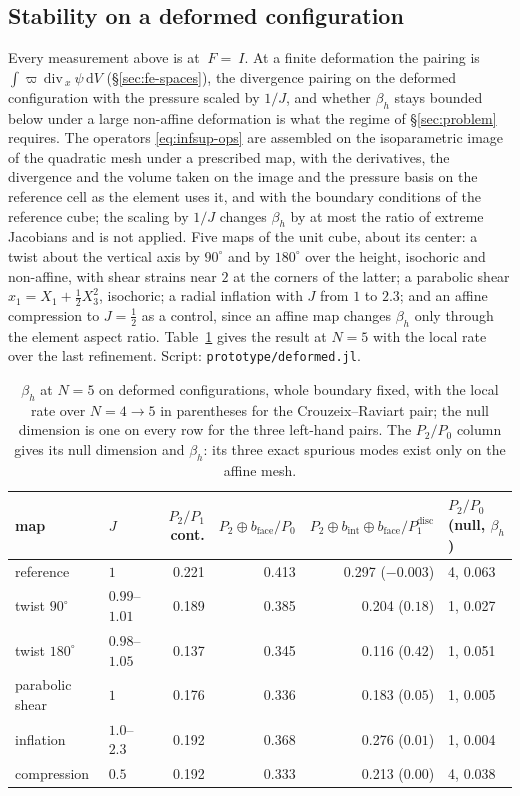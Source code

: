 \documentclass[11pt]{article}
\newcommand{\F}{~F}
\newcommand{\Id}{~I}
\newcommand{\testd}{~\psi}
\newcommand{\bx}{~x}
\newcommand{\diff}{\,\mathrm{d}}
\newcommand{\code}[1]{\texttt{#1}}
\theoremstyle{definition}
\theoremstyle{plain}
\begin{document}
\subsection{Stability on a deformed configuration}
\label{sec:deformed}

Every measurement above is at $\F = \Id$. At a finite deformation the
pairing is $\int \varpi\,\mathrm{div}_{\bx}\testd \diff V$ (\S\ref{sec:fe-spaces}),
the divergence pairing on the deformed configuration with the pressure scaled
by $1/J$, and whether $\beta_h$ stays bounded below under a large non-affine
deformation is what the regime of \S\ref{sec:problem} requires. The operators
\eqref{eq:infsup-ops} are assembled on the isoparametric image of the
quadratic mesh under a prescribed map, with the derivatives, the divergence
and the volume taken on the image and the pressure basis on the reference
cell as the element uses it, and with the boundary conditions of the
reference cube; the scaling by $1/J$ changes $\beta_h$ by at most the ratio
of extreme Jacobians and is not applied. Five maps of the unit cube, about
its center: a twist about the vertical axis by $90^\circ$ and by $180^\circ$
over the height, isochoric and non-affine, with shear strains near $2$ at the
corners of the latter; a parabolic shear $x_1 = X_1 + \tfrac12 X_3^2$,
isochoric; a radial inflation with $J$ from $1$ to $2.3$; and an affine
compression to $J = \tfrac12$ as a control, since an affine map changes
$\beta_h$ only through the element aspect ratio. Table~\ref{tab:deformed}
gives the result at $N = 5$ with the local rate over the last refinement.
Script: \code{prototype/deformed.jl}.

\begin{table}[tbp]
\centering
\caption{$\beta_h$ at $N = 5$ on deformed configurations, whole boundary
fixed, with the local rate over $N = 4 \to 5$ in parentheses for the
Crouzeix--Raviart pair; the null dimension is one on every row for the three
left-hand pairs. The $P_2/P_0$ column gives its null dimension and
$\beta_h$: its three exact spurious modes exist only on the affine mesh.}
\label{tab:deformed}
\begin{tabular}{@{}llrrrl@{}}
\toprule
map & $J$ & $P_2/P_1$ cont. & $P_2 \oplus b_{\mathrm{face}}/P_0$
    & $P_2 \oplus b_{\mathrm{int}} \oplus b_{\mathrm{face}}/P_1^{\mathrm{disc}}$
    & $P_2/P_0$ (null, $\beta_h$) \\
\midrule
reference          & $1$          & 0.221 & 0.413 & 0.297 ($-0.003$) & 4, 0.063 \\
twist $90^\circ$   & $0.99$--$1.01$ & 0.189 & 0.385 & 0.204 ($0.18$)  & 1, 0.027 \\
twist $180^\circ$  & $0.98$--$1.05$ & 0.137 & 0.345 & 0.116 ($0.42$)  & 1, 0.051 \\
parabolic shear    & $1$          & 0.176 & 0.336 & 0.183 ($0.05$)   & 1, 0.005 \\
inflation          & $1.0$--$2.3$   & 0.192 & 0.368 & 0.276 ($0.01$)   & 1, 0.004 \\
compression        & $0.5$        & 0.192 & 0.333 & 0.213 ($0.00$)   & 4, 0.038 \\
\bottomrule
\end{tabular}
\end{table}
\end{document}
